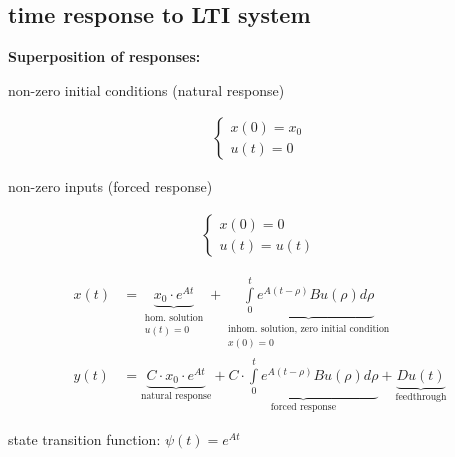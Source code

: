 \subsection{time response to LTI system}
    \begin{center}
        \textbf{Superposition of responses:}
    \end{center}
    
    \begin{minipage}{0.49\linewidth}
        \begin{minipage}{0.49\linewidth}
            non-zero initial conditions (natural response)
        \end{minipage}
        \begin{minipage}{0.49\linewidth}
            \begin{align*}
                \begin{cases}
                    x(0) = x_0\\
                    u(t) = 0
                \end{cases}
            \end{align*}
        \end{minipage}
    \end{minipage}
    \begin{minipage}{0.49\linewidth}
        \begin{minipage}{0.44\linewidth}
            non-zero inputs (forced response)
        \end{minipage}
        \begin{minipage}{0.54\linewidth}
            \begin{align*}
                \begin{cases}
                    x(0) = 0\\
                    u(t) = u(t)
                \end{cases}
            \end{align*}
        \end{minipage}
    \end{minipage}
    \begin{align*}
        x(t) &= \underbrace{x_0 \cdot e^{At}}_{\substack{\text{hom. solution}\\ u(t) = 0}} + \underbrace{\int\limits_0^t e^{A (t-\rho)} B u(\rho) d\rho}_{\substack{\text{inhom. solution, zero initial condition}\\ x(0) = 0}}\\
        y(t) &= \underbrace{C \cdot x_0 \cdot e^{At}}_{\text{natural response}} + \underbrace{C \cdot \int\limits_0^t e^{A (t-\rho)} B u(\rho) d\rho}_{\text{forced response}} + \underbrace{D u(t)}_{\text{feedthrough}}
    \end{align*}

    state transition function: $\psi(t) = e^{At}$